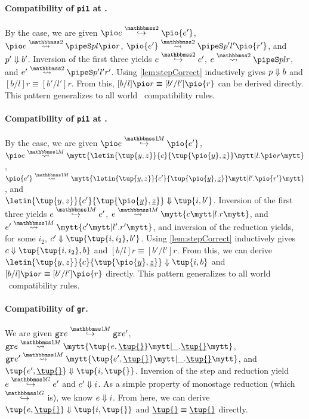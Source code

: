 \begin{abstrsyn}
\paragraph{Compatibility of {\tt pi1} at \bbtwo.}
By the case, we are given 
$\steptwo {\pio e} {\pio {e'}}$, \\
\mbox{$\splittwo {\pio e} A p l {\pio r}$}, 
$\splittwo {\pio {e'}} A {p'} {l'} {\pio {r'}}$,
and ${p'} \Downarrow {b'}$.
Inversion of the first three yields
$\steptwo e {e'}$, $\splittwo e A p l r$, and \mbox{$\splittwo {e'} A {p'} {l'} {r'}$}.
Using \ref{lem:stepCorrect} inductively gives ${p} \Downarrow {b}$ and $[b/l]r \equiv [b'/l']r$.
From this, \mbox{$[b/l]\pio r \equiv [b'/l']\pio {r}$} can be derived directly.
This pattern generalizes to all world \bbtwo\ compatibility rules.

\paragraph{Compatibility of {\tt pi1} at \bbonem.}
By the case, we are given
$\stepmix {\pio e} {\pio {e'}}$, \\
\mbox{$\splitone {\pio e} A {\letin{\tup{y,z}}{c}{\tup{\pio {\exv y},\exv z}}} {l.\pio r}$}, \\
\mbox{$\splitone {\pio {e'}} A {\letin{\tup{y,z}}{c'}{\tup{\pio {\exv y},\exv z}}} {l'.\pio {r'}}$}, and \\
\mbox{$\reduce {\letin{\tup{y,z}}{c'}{\tup{\pio {\exv y},\exv z}}} {\tup{i,b'}}$}.
Inversion of the first three yields 
$\stepmix e {e'}$, $\splitone e A c {l.r}$, and $\splitone {e'} A {c'} {l'.r'}$, 
and inversion of the reduction yields, for some $i_2$, \mbox{$\reduce {c'} {\tup{\tup{i,i_2},b'}}$}.
Using \ref{lem:stepCorrect} inductively gives $\reduce c {\tup{\tup{i,i_2},b}}$ and $[b/l]r \equiv [b'/l']r$.
From this, we can derive $\reduce {\letin{\tup{y,z}}{c}{\tup{\pio {\exv y},\exv z}}} {\tup{i,b}}$ and 
$[b/l]\pio r \equiv [b'/l']\pio {r}$ directly.
This pattern generalizes to all world \bbonem\ compatibility rules.

\paragraph{Compatibility of {\tt gr}.}
We are given 
$\stepmix {\pure e} {\pure {e'}}$, 
$\splitone {\pure e} A {\tup {e,\exv {\tup{}}}} {\_.\exv{\tup{}}}$, 
$\splitone {\pure {e'}} A {\tup {e',\exv {\tup{}}}} {\_.\exv{\tup{}}}$,
and $\reduce {\tup {e',\exv {\tup{}}}} {\tup{i,\tup{}}}$.
Inversion of the step and reduction yield \mbox{$\steppure e {e'}$} and ${e'} \Downarrow {i}$.
As a simple property of monostage reduction (which $\stepsym \bbonep$ is), we know ${e} \Downarrow {i}$.
From here, we can derive $\reduce {\tup {e,\exv {\tup{}}}} {\tup{i,\tup{}}}$ and $\exv{\tup {}} \equiv \exv{\tup {}}$ directly.




\end{abstrsyn}
